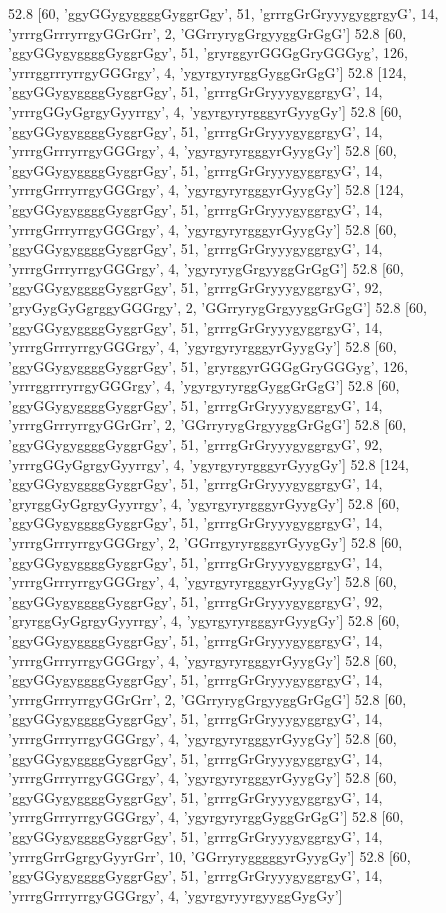 52.8 [60, 'ggyGGygyggggGyggrGgy', 51, 'grrrgGrGryyygyggrgyG', 14, 'yrrrgGrrryrrgyGGrGrr', 2, 'GGrryrygGrgyyggGrGgG']
52.8 [60, 'ggyGGygyggggGyggrGgy', 51, 'gryrggyrGGGgGryGGGyg', 126, 'yrrrggrrryrrgyGGGrgy', 4, 'ygyrgyryrggGyggGrGgG']
52.8 [124, 'ggyGGygyggggGyggrGgy', 51, 'grrrgGrGryyygyggrgyG', 14, 'yrrrgGGyGgrgyGyyrrgy', 4, 'ygyrgyryrgggyrGyygGy']
52.8 [60, 'ggyGGygyggggGyggrGgy', 51, 'grrrgGrGryyygyggrgyG', 14, 'yrrrgGrrryrrgyGGGrgy', 4, 'ygyrgyryrgggyrGyygGy']
52.8 [60, 'ggyGGygyggggGyggrGgy', 51, 'grrrgGrGryyygyggrgyG', 14, 'yrrrgGrrryrrgyGGGrgy', 4, 'ygyrgyryrgggyrGyygGy']
52.8 [124, 'ggyGGygyggggGyggrGgy', 51, 'grrrgGrGryyygyggrgyG', 14, 'yrrrgGrrryrrgyGGGrgy', 4, 'ygyrgyryrgggyrGyygGy']
52.8 [60, 'ggyGGygyggggGyggrGgy', 51, 'grrrgGrGryyygyggrgyG', 14, 'yrrrgGrrryrrgyGGGrgy', 4, 'ygyryrygGrgyyggGrGgG']
52.8 [60, 'ggyGGygyggggGyggrGgy', 51, 'grrrgGrGryyygyggrgyG', 92, 'gryGygGyGgrggyGGGrgy', 2, 'GGrryrygGrgyyggGrGgG']
52.8 [60, 'ggyGGygyggggGyggrGgy', 51, 'grrrgGrGryyygyggrgyG', 14, 'yrrrgGrrryrrgyGGGrgy', 4, 'ygyrgyryrgggyrGyygGy']
52.8 [60, 'ggyGGygyggggGyggrGgy', 51, 'gryrggyrGGGgGryGGGyg', 126, 'yrrrggrrryrrgyGGGrgy', 4, 'ygyrgyryrggGyggGrGgG']
52.8 [60, 'ggyGGygyggggGyggrGgy', 51, 'grrrgGrGryyygyggrgyG', 14, 'yrrrgGrrryrrgyGGrGrr', 2, 'GGrryrygGrgyyggGrGgG']
52.8 [60, 'ggyGGygyggggGyggrGgy', 51, 'grrrgGrGryyygyggrgyG', 92, 'yrrrgGGyGgrgyGyyrrgy', 4, 'ygyrgyryrgggyrGyygGy']
52.8 [124, 'ggyGGygyggggGyggrGgy', 51, 'grrrgGrGryyygyggrgyG', 14, 'gryrggGyGgrgyGyyrrgy', 4, 'ygyrgyryrgggyrGyygGy']
52.8 [60, 'ggyGGygyggggGyggrGgy', 51, 'grrrgGrGryyygyggrgyG', 14, 'yrrrgGrrryrrgyGGGrgy', 2, 'GGrrgyryrgggyrGyygGy']
52.8 [60, 'ggyGGygyggggGyggrGgy', 51, 'grrrgGrGryyygyggrgyG', 14, 'yrrrgGrrryrrgyGGGrgy', 4, 'ygyrgyryrgggyrGyygGy']
52.8 [60, 'ggyGGygyggggGyggrGgy', 51, 'grrrgGrGryyygyggrgyG', 92, 'gryrggGyGgrgyGyyrrgy', 4, 'ygyrgyryrgggyrGyygGy']
52.8 [60, 'ggyGGygyggggGyggrGgy', 51, 'grrrgGrGryyygyggrgyG', 14, 'yrrrgGrrryrrgyGGGrgy', 4, 'ygyrgyryrgggyrGyygGy']
52.8 [60, 'ggyGGygyggggGyggrGgy', 51, 'grrrgGrGryyygyggrgyG', 14, 'yrrrgGrrryrrgyGGrGrr', 2, 'GGrryrygGrgyyggGrGgG']
52.8 [60, 'ggyGGygyggggGyggrGgy', 51, 'grrrgGrGryyygyggrgyG', 14, 'yrrrgGrrryrrgyGGGrgy', 4, 'ygyrgyryrgggyrGyygGy']
52.8 [60, 'ggyGGygyggggGyggrGgy', 51, 'grrrgGrGryyygyggrgyG', 14, 'yrrrgGrrryrrgyGGGrgy', 4, 'ygyrgyryrgggyrGyygGy']
52.8 [60, 'ggyGGygyggggGyggrGgy', 51, 'grrrgGrGryyygyggrgyG', 14, 'yrrrgGrrryrrgyGGGrgy', 4, 'ygyrgyryrggGyggGrGgG']
52.8 [60, 'ggyGGygyggggGyggrGgy', 51, 'grrrgGrGryyygyggrgyG', 14, 'yrrrgGrrGgrgyGyyrGrr', 10, 'GGrryrygggggyrGyygGy']
52.8 [60, 'ggyGGygyggggGyggrGgy', 51, 'grrrgGrGryyygyggrgyG', 14, 'yrrrgGrrryrrgyGGGrgy', 4, 'ygyrgyryyrgyyggGygGy']

